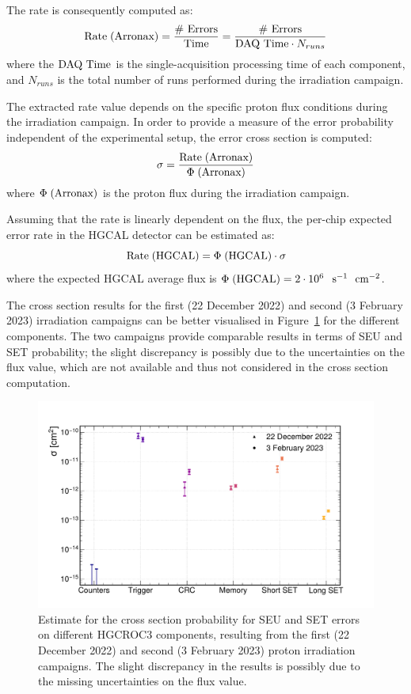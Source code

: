 The rate is consequently computed as:
\begin{equation}
    \textnormal{Rate}\;(\textnormal{Arronax}) = \frac{\textnormal{\# Errors}}{\textnormal{Time}} = \frac{\textnormal{\# Errors}}{\textnormal{DAQ Time}\cdot N_{runs}}
\end{equation}
where the $\textnormal{DAQ Time}$ is the single-acquisition processing time of each component, and $N_{runs}$ is the total number of runs performed during the irradiation campaign.

The extracted rate value depends on the specific proton flux conditions during the irradiation campaign. In order to provide a measure of the error probability independent of the experimental setup, the error cross section is computed:
\begin{equation}
    \sigma = \frac{\textnormal{Rate}\;(\textnormal{Arronax})}{\Phi\;(\textnormal{Arronax})}
\end{equation}
where $\Phi\;(\textnormal{Arronax})$ is the proton flux during the irradiation campaign.

Assuming that the rate is linearly dependent on the flux, the per-chip expected error rate in the HGCAL detector can be estimated as:
\begin{equation}
    \textnormal{Rate}\;(\textnormal{HGCAL}) = \Phi\;(\textnormal{HGCAL}) \cdot \sigma
\end{equation}
where the expected HGCAL average flux is $\Phi\;(\textnormal{HGCAL})=2\cdot10^6$~$\textnormal{s}^{-1}$~$\textnormal{cm}^{-2}$.

\bigbreak

The cross section results for the first (22 December 2022) and second (3 February 2023) irradiation campaigns can be better visualised in Figure~\ref{fig:SEE_CrossSection} for the different components. The two campaigns provide comparable results in terms of SEU and SET probability; the slight discrepancy is possibly due to the uncertainties on the flux value, which are not available and thus not considered in the cross section computation.

\begin{figure}
    \centering
    \includegraphics[width=0.7\linewidth]{Figures/HGCAL/SEE_CrossSection.pdf}
    \caption{Estimate for the cross section probability for SEU and SET errors on different HGCROC3 components, resulting from the first (22 December 2022) and second (3 February 2023) proton irradiation campaigns. The slight discrepancy in the results is possibly due to the missing uncertainties on the flux value.}
    \label{fig:SEE_CrossSection}
\end{figure}

